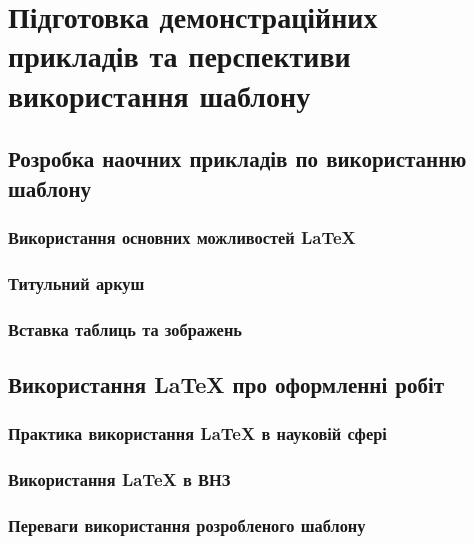 \chapter{Підготовка демонстраційних прикладів та перспективи використання шаблону} 
\label{chap:first}
%
%
%
%
%
\section{Розробка наочних прикладів по використанню шаблону}
%
%
\subsection{Використання основних можливостей \LaTeX{}}
%
%
\subsection{Титульний аркуш}
%
%
\subsection{Вставка таблиць та зображень}
%
%
%
%
%
\section{Використання \LaTeX{} про оформленні робіт}
%
%
\subsection{Практика використання \LaTeX{} в науковій сфері}
%
%
\subsection{Використання \LaTeX{} в ВНЗ}
%
%
\subsection{Переваги використання розробленого шаблону}
